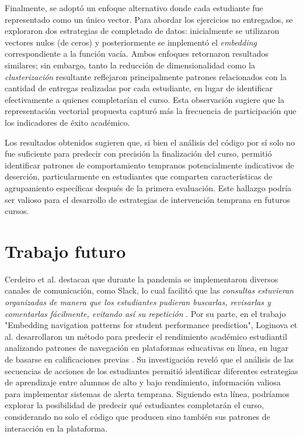 \documentclass[11pt,a4paper,twoside,openany]{tesis}
\begin{document}
Finalmente, se adoptó un enfoque alternativo donde cada estudiante fue representado como un único vector. Para abordar los ejercicios no entregados, se exploraron dos estrategias de completado de datos: inicialmente se utilizaron vectores nulos (de ceros) y posteriormente se implementó el \emph{embedding} correspondiente a la función vacía. Ambos enfoques retornaron resultados similares; sin embargo, tanto la reducción de dimensionalidad como la \emph{clusterización} resultante reflejaron principalmente patrones relacionados con la cantidad de entregas realizadas por cada estudiante, en lugar de identificar efectivamente a quienes completarían el curso. Esta observación sugiere que la representación vectorial propuesta capturó más la frecuencia de participación que los indicadores de éxito académico.

Los resultados obtenidos sugieren que, si bien el análisis del código por sí solo no fue suficiente para predecir con precisión la finalización del curso, permitió identificar patrones de comportamiento tempranos potencialmente indicativos de deserción, particularmente en estudiantes que comparten características de agrupamiento específicas después de la primera evaluación. Este hallazgo podría ser valioso para el desarrollo de estrategias de intervención temprana en futuros cursos.

\chapter{Trabajo futuro}

Cerdeiro et al. destacan que durante la pandemia se implementaron diversos canales de comunicación, como Slack, lo cual facilitó que las \emph{consultas estuvieran organizadas de manera que los estudiantes pudieran buscarlas, revisarlas y comentarlas fácilmente, evitando así su repetición} \cite{unsam2020}. Por su parte, en el trabajo "Embedding navigation patterns for student performance prediction", Loginova et al. desarrollaron un método para predecir el rendimiento académico estudiantil analizando patrones de navegación en plataformas educativas en línea, en lugar de basarse en calificaciones previas \cite{loginova2021embedding}. Su investigación reveló que el análisis de las secuencias de acciones de los estudiantes permitió identificar diferentes estrategias de aprendizaje entre alumnos de alto y bajo rendimiento, información valiosa para implementar sistemas de alerta temprana. Siguiendo esta línea, podríamos explorar la posibilidad de predecir qué estudiantes completarán el curso, considerando no solo el código que producen sino también sus patrones de interacción en la plataforma.
\end{document}
